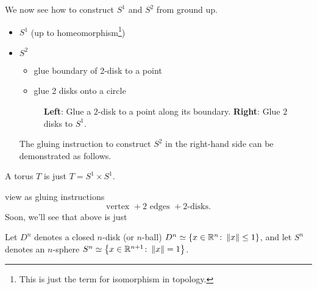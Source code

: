 \begin{eg}
	We now see how to construct \(S^1\) and \(S^2\) from ground up.
	\begin{itemize}
		\item \(S^1\) (up to homeomorphism\footnote{This is just the term for isomorphism in topology.})
		      \begin{center}
		      \end{center}
		\item \(S^2\)
		      \begin{itemize}
			      \item glue boundary of 2-disk to a point
			      \item glue 2 disks onto a circle
		      \end{itemize}
		      \begin{figure}[H]
			      \centering
			      \caption{\textbf{Left}: Glue a \(2\)-disk to a point along its boundary. \textbf{Right}: Glue \(2\) disks to \(S^1\).}
			      \label{fig:eg:constructing-sphere-2}
		      \end{figure}
		      The gluing instruction to construct \(S^2\) in the right-hand side can be demonstrated as follows.
		      \begin{center}
		      \end{center}
	\end{itemize}
\end{eg}
\begin{eg}
	A torus \(T\) is just \(T = S^1 \times S^1\).
	\begin{center}
	\end{center}
	view as gluing instructions
	\[
		\text{vertex }+ 2 \text{ edges }+2\text{-disks}.
	\]
	Soon, we'll see that above is just
	\begin{center}
	\end{center}
\end{eg}


\begin{notation}
	Let \(D^n\) denotes a closed \(n\)-disk (or \(n\)-ball) \(D^n\simeq \left\{x\in\mathbb{\MakeUppercase{R}} ^n\colon \left\lVert x\right\rVert \leq 1\right\}\),
	and let \(S^n\) denotes an \(n\)-sphere \(S^n\simeq \left\{x\in \mathbb{\MakeUppercase{R}}^{n+1}\colon \left\lVert x\right\rVert = 1\right\}\).
\end{notation}

